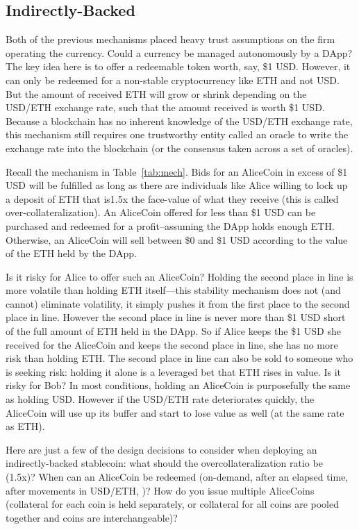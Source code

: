 \subsection{Indirectly-Backed}
\label{sec:dai}

Both of the previous mechanisms placed heavy trust assumptions on the firm operating the currency. Could a currency be managed autonomously by a DApp? The key idea here is to offer a redeemable token worth, say, \$1 USD. However, it can only be redeemed for a non-stable cryptocurrency like ETH and not USD. But the amount of received ETH will grow or shrink depending on the USD/ETH exchange rate, such that the amount received is worth \$1 USD. Because a blockchain has no inherent knowledge of the USD/ETH exchange rate, this mechanism still requires one trustworthy entity called an oracle to write the exchange rate into the blockchain (or the consensus taken across a set of oracles).

Recall the mechanism in Table~\ref{tab:mech}. Bids for an AliceCoin in excess of \$1 USD will be fulfilled as long as there are individuals like Alice willing to lock up a deposit of ETH that is1.5x the face-value of what they receive (this is called over-collateralization). An AliceCoin offered for less than \$1 USD can be purchased and redeemed for a profit--assuming the DApp holds enough ETH. Otherwise, an AliceCoin will sell between \$0 and \$1 USD according to the value of the ETH held by the DApp. 

Is it risky for Alice to offer such an AliceCoin? Holding the second place in line is more volatile than holding ETH itself---this stability mechanism does not (and cannot) eliminate volatility, it simply pushes it from the first place to the second place in line. However the second place in line is never more than \$1 USD short of the full amount of ETH held in the DApp. So if Alice keeps the \$1 USD she received for the AliceCoin and keeps the second place in line, she has no more risk than holding ETH. The second place in line can also be sold to someone who is seeking risk: holding it alone is a leveraged bet that ETH rises in value. Is it risky for Bob? In most conditions, holding an AliceCoin is purposefully the same as holding USD. However if the USD/ETH rate deteriorates quickly, the AliceCoin will use up its buffer and start to lose value as well (at the same rate as ETH).

Here are just a few of the design decisions to consider when deploying an indirectly-backed stablecoin: what should the overcollateralization ratio be (\eg 1.5x)? When can an AliceCoin be redeemed (\eg on-demand, after an elapsed time, after movements in USD/ETH, \etc)? How do you issue multiple AliceCoins (\eg collateral for each coin is held separately, or collateral for all coins are pooled together and coins are interchangeable)?

